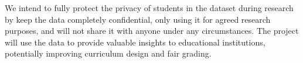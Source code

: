 \documentclass[12pt]{article}
\begin{document}
We intend to fully protect the privacy of students 
in the dataset during research 
by keep the data completely confidential,
only using it for agreed research purposes, 
and will not share it with anyone under any circumstances.
The project will use the data to provide valuable insights to 
educational institutions, 
potentially improving curriculum design and fair grading.





\end{document}

